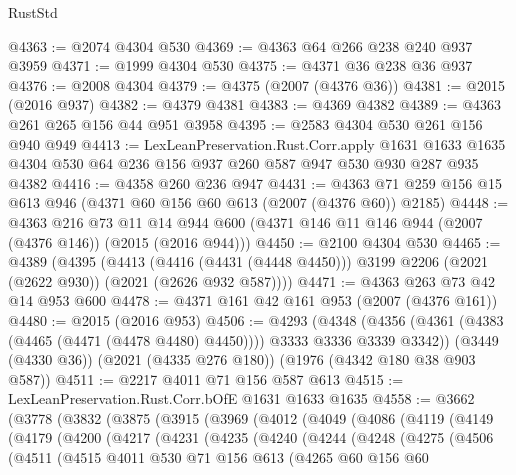 \begin{lexlean}{RustStd}
\begin{coremodule}
{\begin{coremodule}
{{{{{{{{{{{{{{{{@4363 := @2074 @4304 @530
@4369 := @4363 @64 @266 @238 @240 @937 @3959
@4371 := @1999 @4304 @530
@4375 := @4371 @36 @238 @36 @937
@4376 := @2008 @4304
@4379 := @4375 (@2007 (@4376 @36))
@4381 := @2015 (@2016 @937)
@4382 := @4379 @4381
@4383 := @4369 @4382
@4389 := @4363 @261 @265 @156 @44 @951 @3958
@4395 := @2583 @4304 @530 @261 @156 @940 @949
@4413 := LexLeanPreservation.Rust.Corr.apply
    @1631
    @1633
    @1635
    @4304
    @530
    @64
    @236
    @156
    @937
    @260
    @587
    @947
    @530
    @930
    @287
    @935
    @4382
@4416 := @4358 @260 @236 @947
@4431 := @4363 @71 @259 @156 @15 @613 @946 (@4371 @60 @156 @60 @613 (@2007 (@4376 @60)) @2185)
@4448 := @4363
    @216
    @73
    @11
    @14
    @944
    @600
    (@4371 @146 @11 @146 @944 (@2007 (@4376 @146)) (@2015 (@2016 @944)))
@4450 := @2100 @4304 @530
@4465 := @4389
    (@4395
      (@4413
        (@4416 (@4431 (@4448 @4450)))
        @3199
        @2206
        (@2021 (@2622 @930))
        (@2021 (@2626 @932 @587))))
@4471 := @4363 @263 @73 @42 @14 @953 @600
@4478 := @4371 @161 @42 @161 @953 (@2007 (@4376 @161))
@4480 := @2015 (@2016 @953)
@4506 := @4293
    (@4348 (@4356 (@4361 (@4383 (@4465 (@4471 (@4478 @4480) @4450)))) @3333 @3336 @3339 @3342))
    (@3449 (@4330 @36))
    (@2021 (@4335 @276 @180))
    (@1976 (@4342 @180 @38 @903 @587))
@4511 := @2217 @4011 @71 @156 @587 @613
@4515 := LexLeanPreservation.Rust.Corr.bOfE @1631 @1633 @1635
@4558 := @3662
    (@3778
      (@3832
        (@3875
          (@3915
            (@3969
              (@4012
                (@4049
                  (@4086
                    (@4119
                      (@4149
                        (@4179
                          (@4200
                            (@4217
                              (@4231
                                (@4235
                                  (@4240
                                    (@4244
                                      (@4248
                                        (@4275
                                          (@4506
                                            (@4511
                                              (@4515
                                                @4011
                                                @530
                                                @71
                                                @156
                                                @613
                                                (@4265
                                                  @60
                                                  @156
                                                  @60
}}}}}}}}}}}}}}}}
\end{coremodule}}
\end{coremodule}
\end{lexlean}
